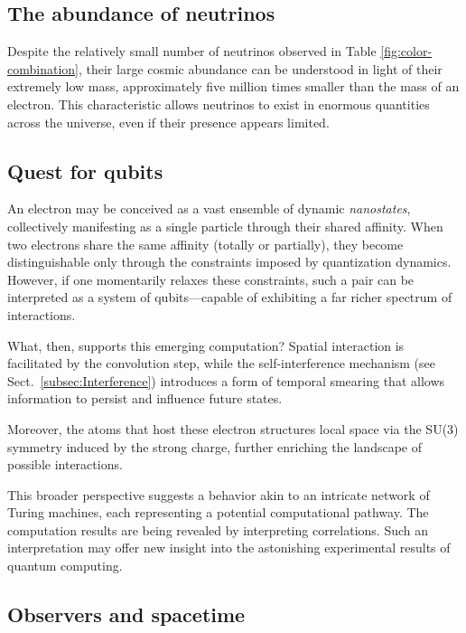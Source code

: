 \documentclass[12pt,english]{article}
\begin{document}
\subsection{The abundance of neutrinos}

Despite the relatively small number of neutrinos observed in Table \ref{fig:color-combination}, their large cosmic abundance can be understood in light of their extremely low mass, approximately five million times smaller than the mass of an electron. This characteristic allows neutrinos to exist in enormous quantities across the universe, even if their presence appears limited.

\subsection{Quest for qubits} \label{subsection:qubits}

An electron may be conceived as a vast ensemble of dynamic \textit{nanostates}, collectively manifesting as a single particle through their shared affinity. When two electrons share the same affinity (totally or partially), they become distinguishable only through the constraints imposed by quantization dynamics. However, if one momentarily relaxes these constraints, such a pair can be interpreted as a system of qubits—capable of exhibiting a far richer spectrum of interactions.

What, then, supports this emerging computation? Spatial interaction is facilitated by the convolution step, while the self-interference mechanism (see Sect.~\ref{subsec:Interference}) introduces a form of temporal smearing that allows information to persist and influence future states.

Moreover, the atoms that host these electron structures local space via the SU(3) symmetry induced by the strong charge, further enriching the landscape of possible interactions.

This broader perspective suggests a behavior akin to an intricate network of Turing machines, each representing a potential computational pathway. The computation results are being revealed by interpreting correlations. Such an interpretation may offer new insight into the astonishing experimental results of quantum computing.

\subsection{Observers and spacetime}  
\end{document}
